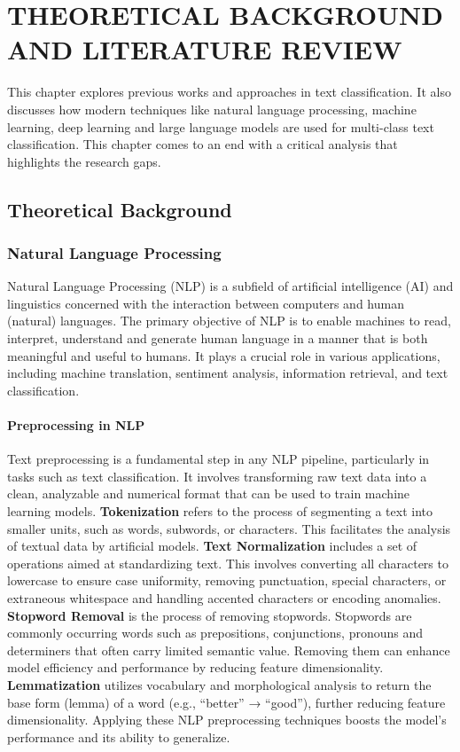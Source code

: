 \chapter{THEORETICAL BACKGROUND AND LITERATURE REVIEW}
\onehalfspacing
\label{chap:literature-review}
\vspace{-3em}
This chapter explores previous works and approaches in text classification. It also discusses how modern techniques like natural language processing, machine learning, deep learning and large language models are used for multi-class text classification. This chapter comes to an end with a critical analysis that highlights the research gaps.
\section{Theoretical Background}
\subsection{Natural Language Processing}

Natural Language Processing (NLP) is a subfield of artificial intelligence (AI) and linguistics concerned with the interaction between computers and human (natural) languages. The primary objective of NLP is to enable machines to read, interpret, understand and generate human language in a manner that is both meaningful and useful to humans. It plays a crucial role in various applications, including machine translation, sentiment analysis, information retrieval, and text classification.

\subsubsection{Preprocessing in NLP}
Text preprocessing is a fundamental step in any NLP pipeline, particularly in tasks such as text classification. It involves transforming raw text data into a clean, analyzable and numerical format that can be used to train machine learning models. 
\textbf{Tokenization} refers to the process of segmenting a text into smaller units, such as words, subwords, or characters. This facilitates the analysis of textual data by artificial models.
\textbf{Text Normalization} includes a set of operations aimed at standardizing text. This involves converting all characters to lowercase to ensure case uniformity, removing punctuation, special characters, or extraneous whitespace and handling accented characters or encoding anomalies.
\textbf{Stopword Removal} is the process of removing stopwords. Stopwords are commonly occurring words such as prepositions, conjunctions, pronouns and determiners that often carry limited semantic value. Removing them can enhance model efficiency and performance by reducing feature dimensionality.
\textbf{Lemmatization} utilizes vocabulary and morphological analysis to return the base form (lemma) of a word (e.g., “better” → “good”), further reducing feature dimensionality.
Applying these NLP preprocessing techniques boosts the model's performance and its ability to generalize.

